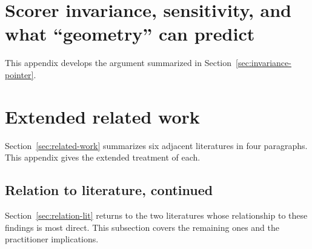 \section{Scorer invariance, sensitivity, and what ``geometry'' can predict}
\label{app:invariance}

This appendix develops the argument summarized in
Section~\ref{sec:invariance-pointer}.



\section{Extended related work}
\label{app:related-work}

Section~\ref{sec:related-work} summarizes six adjacent literatures in four
paragraphs. This appendix gives the extended treatment of each.



\subsection{Relation to literature, continued}
\label{app:relation-lit}

Section~\ref{sec:relation-lit} returns to the two literatures whose relationship
to these findings is most direct. This subsection covers the remaining ones and
the practitioner implications.


